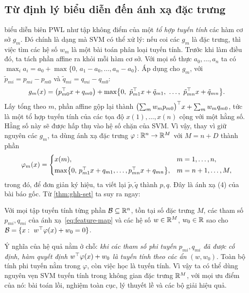 \subsection{Từ định lý biểu diễn đến ánh xạ đặc trưng}

 biểu diễn biên PWL như tập không điểm của một \emph{tổ hợp tuyến tính} các hàm cơ sở $g_m$. Đó chính là dạng mà SVM có thể xử lý: nếu coi các $g_m$ là đặc trưng, thì việc tìm các hệ số $w_m$ là một bài toán phân loại tuyến tính. Trước khi làm điều đó, ta tách phần affine ra khỏi mỗi hàm cơ sở. Với mọi số thực $a_0,\dots,a_n$ ta có $\max_i a_i=a_0+\max\{0,\,a_1-a_0,\dots,a_n-a_0\}$. Áp dụng cho $g_m$, với $\tilde p_{mi}=p_{mi}-p_{m0}$ và $\tilde q_{mi}=q_{mi}-q_{m0}$:
\[
g_m(x)=\bigl(p_{m0}^\T x+q_{m0}\bigr)+\max\bigl\{0,\ \tilde p_{m1}^\T x+\tilde q_{m1},\ \dots,\ \tilde p_{mn}^\T x+\tilde q_{mn}\bigr\}.
\]
Lấy tổng theo $m$, phần affine gộp lại thành $\bigl(\sum_m w_m p_{m0}\bigr)^\top x+\sum_m w_m q_{m0}$, tức là một tổ hợp tuyến tính của các tọa độ $x(1),\dots,x(n)$ cộng với một hằng số. Hằng số này sẽ được hấp thụ vào hệ số chặn của SVM. Vì vậy, thay vì giữ nguyên các $g_m$, ta dùng ánh xạ đặc trưng $\varphi:\mathbb{R}^n\to\mathbb{R}^M$ với $M=n+D$ thành phần
\begin{equation}\label{eq:feature-map}
\varphi_m(x)=
\begin{cases}
x(m), & m=1,\dots,n,\\[2pt]
\max\bigl\{0,\,p_{m1}^\top x+q_{m1},\dots,p_{mn}^\top x+q_{mn}\bigr\}, & m=n+1,\dots,M,
\end{cases}
\end{equation}
trong đó, để đơn giản ký hiệu, ta viết lại $\tilde p,\tilde q$ thành $p,q$. Đây là ánh xạ (4) của bài báo gốc. Từ \cref{thm:ghh-set} ta suy ra ngay:

\begin{corollary}\label{cor:boundary}
Với mọi tập tuyến tính từng phần $\mathcal{B}\subseteq\mathbb{R}^n$, tồn tại số đặc trưng $M$, các tham số $p_{mi},q_{mi}$ của ánh xạ~\eqref{eq:feature-map} và các hệ số $w\in\mathbb{R}^M$, $w_0\in\mathbb{R}$ sao cho $\mathcal{B}=\{x:\ w^\top\varphi(x)+w_0=0\}$.
\end{corollary}

Ý nghĩa của hệ quả nằm ở chỗ: \emph{khi các tham số phi tuyến $p_{mi},q_{mi}$ đã được cố định, hàm quyết định $w^\top\varphi(x)+w_0$ là tuyến tính theo các ẩn $(w,w_0)$}. Toàn bộ tính phi tuyến nằm trong $\varphi$, còn việc học là tuyến tính. Vì vậy ta có thể dùng nguyên vẹn SVM tuyến tính trong không gian đặc trưng $\mathbb{R}^M$, với mọi ưu điểm của nó: bài toán lồi, nghiệm toàn cục, lý thuyết lề và các bộ giải hiệu quả.

